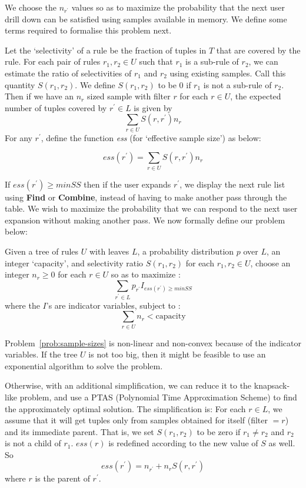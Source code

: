 We choose the $n_{r^{\prime}}$ values so as to maximize the probability that the next user drill down can be satisfied using samples available in memory. We define some terms required to formalise this problem next. 

Let the `selectivity' of a rule be the fraction of tuples in $T$ that are covered by the rule. For each pair of rules $r_1, r_2 \in U$ such that $r_1$ is a sub-rule of $r_2$, we can estimate the ratio of selectivities of $r_1$ and $r_2$ using existing samples. Call this quantity $S(r_1, r_2)$. We define $S(r_1, r_2)$ to be $0$ if $r_1$ is not a sub-rule of $r_2$. Then if we have an $n_r$ sized sample with filter $r$ for each $r \in U$, the expected number of tuples covered by $r^{\prime} \in L$ is given by $$\sum_{r \in U} S(r, r^{\prime})n_r$$ For any $r^{\prime}$, define the function {\em ess} (for `effective sample size') as below: 
\begin{definition}\label{def:ess}
$$ess(r^{\prime}) = \sum_{r \in U} S(r, r^{\prime})n_r$$ 
\end{definition}
If $ess(r^{\prime}) \geq minSS$ then if the user expands $r^{\prime}$, we display the next rule list using \textbf{Find} or \textbf{Combine}, instead of having to make another pass through the table. We wish to maximize the probability that we can respond to the next user expansion without making another pass. We now formally define our problem below:
\begin{problem}\label{prob:sample-sizes}
Given a tree of rules $U$ with leaves $L$, a probability distribution $p$ over $L$, an integer `capacity', and selectivity ratio $S(r_1, r_2)$ for each $r_1, r_2 \in U$, 
choose an integer $n_r \geq 0$ for each $r \in U$ so as to $\textrm{maximize}$ :
$$\sum_{r^{\prime} \in L} p_{r^{\prime}}I_{ess(r^{\prime}) \geq minSS}$$
where the $I$'s are indicator variables, subject to :
$$\sum_{r \in U} n_r < \text{capacity}$$
\end{problem}
Problem~\ref{prob:sample-sizes} is non-linear and non-convex because of the indicator variables. If the tree $U$ is not too big, then it might be feasible to use an exponential algorithm to solve the problem. 

Otherwise, with an additional simplification, we can reduce it to the knapsack-like problem, and use a PTAS (Polynomial Time Approximation Scheme) to find the approximately optimal solution. The simplification is: For each $r \in L$, we assume that it will get tuples only from samples obtained for itself (filter $= r$) and its immediate parent. That is, we set $S(r_1, r_2)$ to be zero if $r_1 \neq r_2$ and $r_2$ is not a child of $r_1$. $ess(r)$ is redefined according to the new value of $S$ as well. So $$ess(r^{\prime}) = n_{r^{\prime}} + n_rS(r, r^{\prime})$$ where $r$ is the parent of $r^{\prime}$. 


